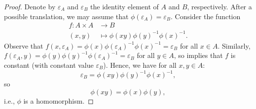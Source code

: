 \begin{proof}
	Denote by $\varepsilon_A$ and $\varepsilon_B$ the identity element of $A$ and $B$, respectively. After a possible translation, we may assume that $\phi(\varepsilon_A)=\varepsilon_B$. Consider the function
	\begin{align*}
		f:A\times A&\rightarrow B\\
		(x,y)&\mapsto \phi(xy)\phi(y)^{-1}\phi(x)^{-1}.
	\end{align*}
	Observe that $f(x,\varepsilon_A)=\phi(x)\phi(\varepsilon_A)^{-1}\phi(x)^{-1}=\varepsilon_B$ for all $x\in A$. Similarly, $f(\varepsilon_A,y)=\phi(y)\phi(y)^{-1}\phi(\varepsilon_A)^{-1}=\varepsilon_B$ for all $y\in A$, so  implies that $f$ is constant (with constant value $\varepsilon_B$). Hence, we have for all $x,y\in A$:
	\begin{equation*}
		\varepsilon_B=\phi(xy)\phi(y)^{-1}\phi(x)^{-1},
	\end{equation*}
	so
	\begin{equation*}
		\phi(xy)=\phi(x)\phi(y),
	\end{equation*}
	i.e., $\phi$ is a homomorphism.
\end{proof}

